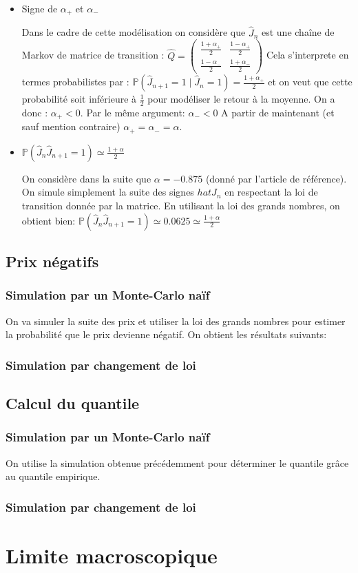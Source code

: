 \documentclass[a4paper,11pt]{article}
\begin{document}
\begin{itemize}

\item Signe de $\alpha_{+}$ et $\alpha_{-}$

Dans le cadre de cette modélisation on considère que $\hat{J}_{n}$ est une chaîne de Markov de matrice de transition :
$\hat{Q} = \begin{pmatrix}
\frac{1+\alpha_{+}}{2} & \frac{1-\alpha_{+}}{2} \\ 
 \frac{1-\alpha_{-}}{2}  & \frac{1+\alpha_{-}}{2} 
\end{pmatrix}$
Cela s'interprete en termes probabilistes par :
$\mathbb{P}(\hat{J}_{n+1}=1\mid \hat{J}_{n}=1)=\frac{1+\alpha_{+}}{2}$ et on veut que cette probabilité soit inférieure à $\frac{1}{2}$ pour modéliser le retour à la moyenne. On a donc : $\alpha_{+}<0$. Par le même argument: $\alpha_{-}<0$
A partir de maintenant (et sauf mention contraire) $\alpha_{+}=\alpha_{-}=\alpha$.

\item $\mathbb{P} (\hat{J}_{n}\hat{J}_{n+1}=1) \simeq \frac{1+\alpha }{2}$

On considère dans la suite que $\alpha = -0.875$ (donné par l'article de référence). On simule simplement la suite des signes $hat{J}_{n}$  en respectant la loi de transition donnée par la matrice. En utilisant la loi des grands nombres, on obtient bien:
$\mathbb{P} (\hat{J}_{n}\hat{J}_{n+1}=1) \simeq 0.0625 \simeq \frac{1+\alpha }{2}$

\end{itemize}

\subsection{Prix négatifs}


\subsubsection{Simulation par un Monte-Carlo naïf}
On va simuler la suite des prix et utiliser la loi des grands nombres pour estimer la probabilité que le prix devienne négatif. On obtient les résultats suivants:


\subsubsection{Simulation par changement de loi}


\subsection{Calcul du quantile}

\subsubsection{Simulation par un Monte-Carlo naïf}
On utilise la simulation obtenue précédemment pour déterminer le quantile grâce au quantile empirique.

\subsubsection{Simulation par changement de loi}

\section{Limite macroscopique}
\end{document}
